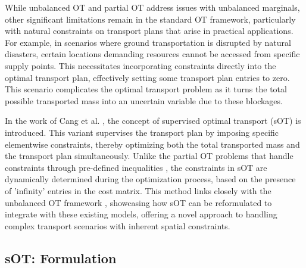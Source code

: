 \documentclass[11pt]{book}
\begin{document}
While unbalanced OT and partial OT address issues with unbalanced marginals, other significant limitations remain in the standard OT framework, particularly with natural constraints on transport plans that arise in practical applications. For example, in scenarios where ground transportation is disrupted by natural disasters, certain locations demanding resources cannot be accessed from specific supply points. This necessitates incorporating constraints directly into the optimal transport plan, effectively setting some transport plan entries to zero. This scenario complicates the optimal transport problem as it turns the total possible transported mass into an uncertain variable due to these blockages.

In the work of Cang et al. \cite{cang2022supervised}, the concept of supervised optimal transport (sOT) is introduced. This variant supervises the transport plan by imposing specific elementwise constraints, thereby optimizing both the total transported mass and the transport plan simultaneously. Unlike the partial OT problems that handle constraints through pre-defined inequalities \cite{benamou2015augmented}, the constraints in sOT are dynamically determined during the optimization process, based on the presence of 'infinity' entries in the cost matrix. This method links closely with the unbalanced OT framework \cite{chizat2018unbalanced}, showcasing how sOT can be reformulated to integrate with these existing models, offering a novel approach to handling complex transport scenarios with inherent spatial constraints.




\subsection{sOT: Formulation}
\end{document}
